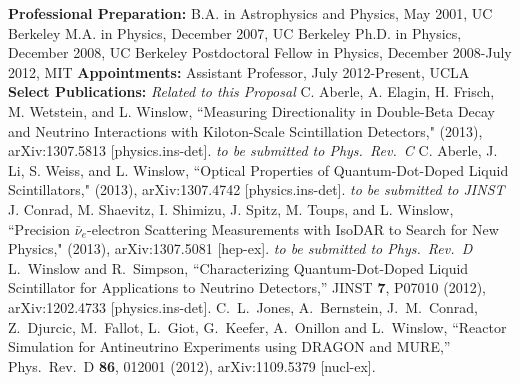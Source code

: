 


{\bf Professional Preparation:} 
\newline \noindent
B.A. in Astrophysics and Physics, May 2001, UC Berkeley
\newline \noindent
M.A. in Physics, December 2007, UC Berkeley
\newline \noindent
Ph.D. in Physics, December 2008, UC Berkeley
\newline \noindent
Postdoctoral Fellow in Physics, December 2008-July 2012, MIT
\newline\newline \noindent
{\bf Appointments:} 
\newline \noindent
Assistant Professor, July 2012-Present, UCLA
\newline\newline \noindent
{\bf Select  Publications:}
\newline\newline\noindent
{\it Related to this Proposal}
\newline\noindent
C. Aberle, A. Elagin, H. Frisch, M. Wetstein, and L. Winslow, ``Measuring Directionality in Double-Beta Decay and Neutrino Interactions with Kiloton-Scale Scintillation Detectors," (2013), arXiv:1307.5813 [physics.ins-det]. {\it to be submitted to Phys.\ Rev.\ C}
\newline\newline\noindent
C. Aberle, J. Li, S. Weiss, and L. Winslow, ``Optical Properties of Quantum-Dot-Doped Liquid Scintillators,"  (2013), arXiv:1307.4742 [physics.ins-det]. {\it to be submitted to JINST}
\newline\newline \noindent
J. Conrad, M. Shaevitz, I. Shimizu, J. Spitz, M. Toups, and L. Winslow, ``Precision $\bar{\nu}_{e}$-electron Scattering Measurements with IsoDAR to Search for New Physics," (2013), arXiv:1307.5081 [hep-ex]. {\it to be submitted to Phys.\ Rev.\ D}
\newline\newline \noindent
L.~Winslow and R.~Simpson, ``Characterizing Quantum-Dot-Doped Liquid Scintillator for Applications to Neutrino Detectors,'' JINST {\bf 7}, P07010 (2012), arXiv:1202.4733 [physics.ins-det].
\newline\newline\noindent
C.~L.~Jones, A.~Bernstein, J.~M.~Conrad, Z.~Djurcic, M.~Fallot, L.~Giot, G.~Keefer, A.~Onillon and L.~Winslow, ``Reactor Simulation for Antineutrino Experiments using DRAGON and MURE,'' Phys.\ Rev.\ D {\bf 86}, 012001 (2012), arXiv:1109.5379 [nucl-ex].
